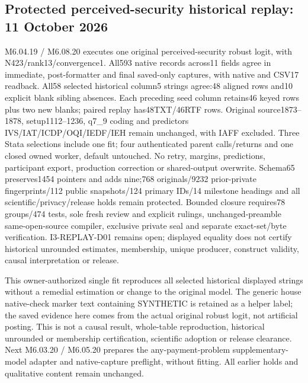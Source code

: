 \documentclass[11pt,a4paper]{article}
\begin{document}
\subsection*{Protected perceived-security historical replay: 11 October 2026}
M6.04.19 / M6.08.20 executes one original perceived-security robust logit, with N423/rank13/convergence1. All593 native records across11 fields agree in immediate, post-formatter and final saved-only captures, with native and CSV17 readback. All58 selected historical column5 strings agree:48 aligned rows and10 explicit blank sibling absences. Each preceding seed column retains46 keyed rows plus two new blanks; paired replay has48TXT/46RTF rows. Original source1873--1878, setup1112--1236, q7\_9 coding and predictors IVS/IAT/ICDP/OQI/IEDF/IEH remain unchanged, with IAFF excluded. Three Stata selections include one fit; four authenticated parent calls/returns and one closed owned worker, default untouched. No retry, margins, predictions, participant export, production correction or shared-output overwrite. Schema65 preserves1454 pointers and adds nine;768 originals/9232 prior-private fingerprints/112 public snapshots/124 primary IDs/14 milestone headings and all scientific/privacy/release holds remain protected. Bounded closure requires78 groups/474 tests, sole fresh review and explicit rulings, unchanged-preamble same-open-source compiler, exclusive private seal and separate exact-set/byte verification. I3-REPLAY-D01 remains open; displayed equality does not certify historical unrounded estimates, membership, unique producer, construct validity, causal interpretation or release.

This owner-authorized single fit reproduces all selected historical displayed strings without a remedial estimation or change to the original model. The generic house native-check marker text containing SYNTHETIC is retained as a helper label; the saved evidence here comes from the actual original robust logit, not artificial posting. This is not a causal result, whole-table reproduction, historical unrounded or membership certification, scientific adoption or release clearance. Next M6.03.20 / M6.05.20 prepares the any-payment-problem supplementary-model adapter and native-capture preflight, without fitting. All earlier holds and qualitative content remain unchanged.
\end{document}
